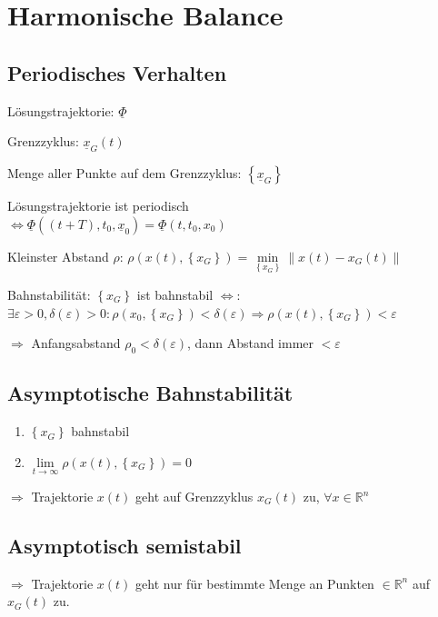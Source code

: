 \documentclass[german]{latex4ei/latex4ei_sheet}
\begin{document}
\section{Harmonische Balance}
\begin{sectionbox}

\subsection{Periodisches Verhalten}

Lösungstrajektorie: $\underline{\Phi}$

Grenzzyklus: $\underline{x}_G(t)$

Menge aller Punkte auf dem Grenzzyklus: $\left\{ \underline{x}_G \right\}$

Lösungstrajektorie ist periodisch\\ $ \Leftrightarrow \underline{\Phi}\left( (t+T), t_0, \underline{x}_0 \right) = \underline{\Phi}\left( t,t_0,x_0 \right)$

Kleinster Abstand $\rho$: $\rho\left( x(t), \left\{ x_G \right\} \right) = \min\limits_{ \left\{ x_G \right\} } \|x(t) - x_G(t)\| $

Bahnstabilität: $\left\{ x_G \right\}$ ist bahnstabil $\Leftrightarrow$:
$\exists \varepsilon > 0, \delta(\varepsilon) > 0: \rho(x_0, \left\{ x_G \right\}) < \delta(\varepsilon) \Rightarrow \rho(x(t), \left\{ x_G \right\}) < \varepsilon$

$\Rightarrow$ Anfangsabstand $\rho_0 < \delta(\varepsilon)$, dann Abstand immer $< \varepsilon$

\subsection{Asymptotische Bahnstabilität}

\begin{enumerate}
  \item $\left\{ x_G \right\}$ bahnstabil
  \item $\lim\limits_{t \rightarrow \infty} \rho\left( x(t), \left\{ x_G \right\} \right) = 0 $
\end{enumerate}
$\Rightarrow$ Trajektorie $x(t)$ geht auf Grenzzyklus $x_G(t)$ zu, $\forall x \in \mathbb{R}^n$

\subsection{Asymptotisch semistabil}
$\Rightarrow$ Trajektorie $x(t)$ geht nur für bestimmte Menge an Punkten $\in \mathbb{R}^n$ auf $x_G(t)$ zu.
\end{sectionbox}
\end{document}
